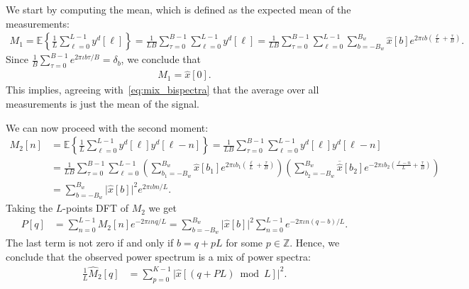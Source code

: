 \documentclass[english,12pt]{article}
\newcommand{\I}{\iota}
\newcommand{\tB}{B_w}
\newcommand{\hx}{\hat{x}}
\newcommand{\E}{\mathbb{E}}
\numberwithin{equation}{section}
\numberwithin{mytheorem}{section} %
\begin{document}
We start by computing the mean, which is defined as the expected mean of the measurements: 
\begin{equation}
\begin{split}
M_1 = \E\left\{ \frac{1}{L} \sum_{\ell=0}^{L-1} y^d[\ell]\right\} =  \frac{1}{LB}\sum_{\tau=0}^{B-1}\sum_{\ell=0}^{L-1} y^d[\ell] =  \frac{1}{LB}\sum_{\tau=0}^{B-1}\sum_{\ell=0}^{L-1}
\sum_{b=-\tB}^{\tB}\hat{x}[b]e^{2\pi\I b \left(\frac{\ell}{L} + \frac{\tau}{B}\right) }.
\end{split}
\end{equation}
Since $\frac{1}{B}\sum_{\tau=0}^{B-1}e^{2\pi\I b \tau/B}=\delta_b$, we conclude that 
\begin{equation} \label{eq:mean}
\begin{split}
M_1 = \hx[0].
\end{split}
\end{equation}
This  implies, agreeing with~\eqref{eq:mix_bispectra} that the average over all measurements is just the mean of the signal.  

We can now proceed with the second moment:
\begin{equation} \label{eq:ps}
\begin{split}
M_2[n] &= \E\left\{\frac{1}{L}\sum_{\ell=0}^{L-1} y^d[\ell]y^d[\ell-n]\right\} =  \frac{1}{LB}\sum_{\tau=0}^{B-1}\sum_{\ell=0}^{L-1} y^d[\ell]y^d[\ell-n] \\ &=  \frac{1}{LB}\sum_{\tau=0}^{B-1}\sum_{\ell=0}^{L-1}
\left(\sum_{b_1=-\tB}^{\tB}\hat{x}[b_1]e^{2\pi\I b_1 \left(\frac{\ell}{L} + \frac{\tau}{B}\right)} \right)
\left(\sum_{b_2=-\tB}^{\tB}\overline{\hx}[b_2]e^{-2\pi\I b_2 \left(\frac{\ell-n}{L} + \frac{\tau}{B}\right)} \right) \\
&=
\sum_{b=-\tB}^{\tB}\vert \hat{x}[b]\vert ^2e^{2\pi\I bn/L}.
\end{split}
\end{equation}
Taking the $L$-points DFT of $M_2$ we get 
\begin{equation}
\begin{split}
P[q] &= \sum_{n=0}^{L-1}M_2[n]e^{-2\pi\I nq/L} = \sum_{b=-\tB}^{\tB}\vert \hat{x}[b]\vert^2\sum_{n=0}^{L-1}e^{-2\pi\I n(q-b)/L}.
\end{split}
\end{equation}
The last term is not zero if and only if $b = q + pL$ for some $p\in\mathbb{Z}$.  Hence, we conclude that the observed power spectrum is a mix of power spectra:
\begin{equation}
\begin{split}
\frac{1}{L}\hat{M}_2[q] &=  \sum_{p=0}^{K-1} \vert \hat{x}[(q+PL)\bmod L]\vert^2.
\end{split}
\end{equation}
\end{document}
